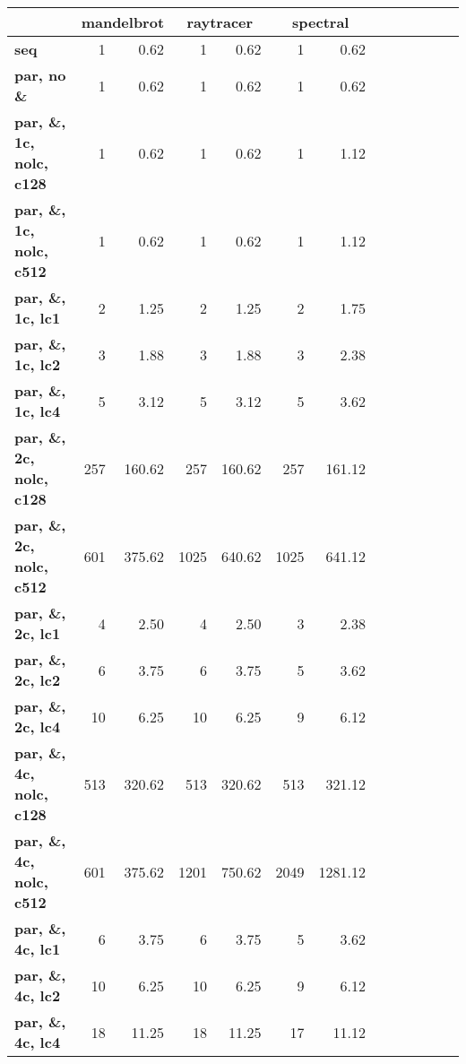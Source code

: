{\small
\begin{tabular}{|l|rr|rr|rr|rr|rr|rr|}
\hline
& \multicolumn{2}{|c|}{\textbf{mandelbrot}}
& \multicolumn{2}{|c|}{\textbf{raytracer}}
& \multicolumn{2}{|c|}{\textbf{spectral}}
\\
\hline
\textbf{                           seq}  &    1 &  0.62 &    1 &  0.62 &    1 &  0.62\\
\textbf{                    par, no \&}  &    1 &  0.62 &    1 &  0.62 &    1 &  0.62\\
\hline
\textbf{       par, \&, 1c, nolc, c128}  &    1 &  0.62 &    1 &  0.62 &    1 &  1.12\\
\textbf{       par, \&, 1c, nolc, c512}  &    1 &  0.62 &    1 &  0.62 &    1 &  1.12\\
\textbf{              par, \&, 1c, lc1}  &    2 &  1.25 &    2 &  1.25 &    2 &  1.75\\
\textbf{              par, \&, 1c, lc2}  &    3 &  1.88 &    3 &  1.88 &    3 &  2.38\\
\textbf{              par, \&, 1c, lc4}  &    5 &  3.12 &    5 &  3.12 &    5 &  3.62\\
\hline
\textbf{       par, \&, 2c, nolc, c128}  &  257 & 160.62 &  257 & 160.62 &  257 & 161.12\\
\textbf{       par, \&, 2c, nolc, c512}  &  601 & 375.62 & 1025 & 640.62 & 1025 & 641.12\\
\textbf{              par, \&, 2c, lc1}  &    4 &  2.50 &    4 &  2.50 &    3 &  2.38\\
\textbf{              par, \&, 2c, lc2}  &    6 &  3.75 &    6 &  3.75 &    5 &  3.62\\
\textbf{              par, \&, 2c, lc4}  &   10 &  6.25 &   10 &  6.25 &    9 &  6.12\\
\hline
\textbf{       par, \&, 4c, nolc, c128}  &  513 & 320.62 &  513 & 320.62 &  513 & 321.12\\
\textbf{       par, \&, 4c, nolc, c512}  &  601 & 375.62 & 1201 & 750.62 & 2049 & 1281.12\\
\textbf{              par, \&, 4c, lc1}  &    6 &  3.75 &    6 &  3.75 &    5 &  3.62\\
\textbf{              par, \&, 4c, lc2}  &   10 &  6.25 &   10 &  6.25 &    9 &  6.12\\
\textbf{              par, \&, 4c, lc4}  &   18 & 11.25 &   18 & 11.25 &   17 & 11.12\\
\hline
\end{tabular}
}
